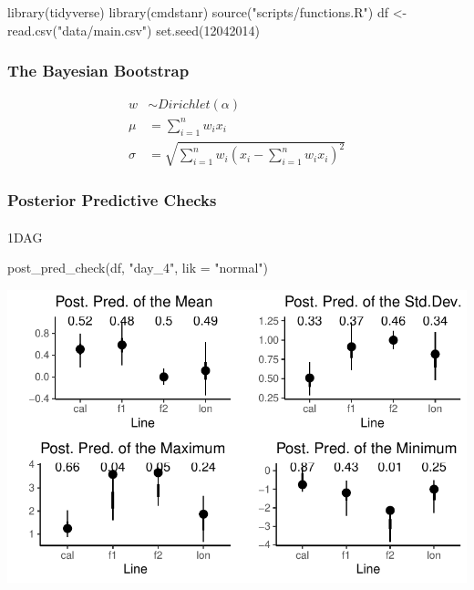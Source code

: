 \documentclass[
  letterpaper,
  DIV=11,
  numbers=noendperiod]{scrartcl}
\author{}
\date{}
\makeatletter
\let\oldparagraph\paragraph
\renewcommand{\paragraph}{
    \@ifstar
      \xxxParagraphStar
      \xxxParagraphNoStar
  }
\newcommand{\xxxParagraphStar}[1]{\oldparagraph*{#1}\mbox{}}
\newcommand{\xxxParagraphNoStar}[1]{\oldparagraph{#1}\mbox{}}
\newenvironment{Shaded}{\begin{snugshade}}{\end{snugshade}}
\newcommand{\AttributeTok}[1]{\textcolor[rgb]{0.40,0.45,0.13}{#1}}
\newcommand{\DecValTok}[1]{\textcolor[rgb]{0.68,0.00,0.00}{#1}}
\newcommand{\FunctionTok}[1]{\textcolor[rgb]{0.28,0.35,0.67}{#1}}
\newcommand{\NormalTok}[1]{\textcolor[rgb]{0.00,0.23,0.31}{#1}}
\newcommand{\OtherTok}[1]{\textcolor[rgb]{0.00,0.23,0.31}{#1}}
\newcommand{\StringTok}[1]{\textcolor[rgb]{0.13,0.47,0.30}{#1}}
\makeatother
\begin{document}
\begin{Shaded}
\begin{Highlighting}[]
\FunctionTok{library}\NormalTok{(tidyverse)}
\FunctionTok{library}\NormalTok{(cmdstanr)}
\FunctionTok{source}\NormalTok{(}\StringTok{"scripts/functions.R"}\NormalTok{)}
\NormalTok{df }\OtherTok{\textless{}{-}} \FunctionTok{read.csv}\NormalTok{(}\StringTok{"data/main.csv"}\NormalTok{)}
\FunctionTok{set.seed}\NormalTok{(}\DecValTok{12042014}\NormalTok{)}
\end{Highlighting}
\end{Shaded}

\subsubsection{The Bayesian Bootstrap}\label{the-bayesian-bootstrap}

\begin{align*}
w &\sim Dirichlet(\alpha)  \\
\mu &= \sum_{i=1}^nw_ix_i \\
\sigma &= \sqrt{\sum_{i=1}^nw_i(x_i-\sum_{i=1}^nw_ix_i)^2}
\end{align*}

\subsubsection{Posterior Predictive
Checks}\label{posterior-predictive-checks}

\paragraph{1DAG}\label{dag}

\begin{Shaded}
\begin{Highlighting}[]
\FunctionTok{post\_pred\_check}\NormalTok{(df, }\StringTok{"day\_4"}\NormalTok{, }\AttributeTok{lik =} \StringTok{"normal"}\NormalTok{)}
\end{Highlighting}
\end{Shaded}

\includegraphics{analysis_files/figure-pdf/unnamed-chunk-2-1.pdf}
\end{document}
